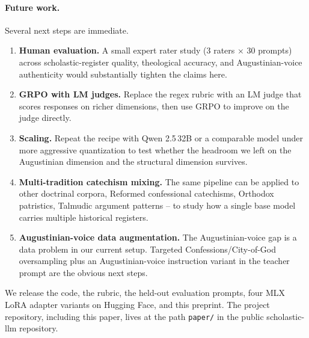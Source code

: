 \paragraph{Future work.} Several next steps are immediate.
\begin{enumerate}
  \item \textbf{Human evaluation.} A small expert rater study (3 raters
        $\times$ 30 prompts) across scholastic-register quality,
        theological accuracy, and Augustinian-voice authenticity would
        substantially tighten the claims here.
  \item \textbf{GRPO with LM judges.} Replace the regex rubric with an LM
        judge that scores responses on richer dimensions, then use
        GRPO \cite{grpo} to improve on the judge directly.
  \item \textbf{Scaling.} Repeat the recipe with Qwen 2.5\,32B or a
        comparable model under more aggressive quantization to test
        whether the headroom we left on the Augustinian dimension and
        the structural dimension survives.
  \item \textbf{Multi-tradition catechism mixing.} The same pipeline can
        be applied to other doctrinal corpora, Reformed confessional
        catechisms, Orthodox patristics, Talmudic argument patterns --
        to study how a single base model carries multiple historical
        registers.
  \item \textbf{Augustinian-voice data augmentation.} The
        Augustinian-voice gap is a data problem in our current setup.
        Targeted Confessions/City-of-God oversampling plus an
        Augustinian-voice instruction variant in the teacher prompt are
        the obvious next steps.
\end{enumerate}

We release the code, the rubric, the held-out evaluation prompts, four
MLX LoRA adapter variants on Hugging Face, and this preprint. The
project repository, including this paper, lives at the path
\texttt{paper/} in the public scholastic-llm repository.
